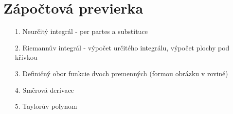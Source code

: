 \section{Zápočtová previerka}

\begin{enumerate}
    \item [1.] Neurčitý integrál - per partes a substituce
    \item [2.] Riemannův integrál - výpočet určitého integrálu, výpočet plochy pod křivkou
    \item [3.] Definičný obor funkcie dvoch premenných (formou obrázku v rovině)
    \item [4.] Směrová derivace
    \item [5.] Taylorův polynom
\end{enumerate}
